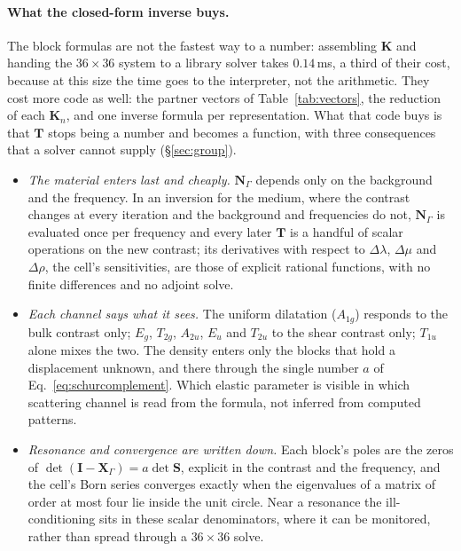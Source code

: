 \documentclass[11pt,a4paper]{article}
\newcommand{\bK}{\mathbf{K}}
\newcommand{\bN}{\mathbf{N}}
\newcommand{\bT}{\mathbf{T}}
\newcommand{\bI}{\mathbf{I}}
\begin{document}
\paragraph{What the closed-form inverse buys.} The block formulas are not the fastest way to a number:
assembling $\bK$ and handing the $36\times36$ system to a library solver takes $0.14$\,ms, a third of their
cost, because at this size the time goes to the interpreter, not the arithmetic. They cost more code as
well: the partner vectors of Table~\ref{tab:vectors}, the reduction of each $\bK_n$, and one inverse
formula per representation. What that code buys is that $\bT$ stops being a number and becomes a function,
with three consequences that a solver cannot supply (\S\ref{sec:group}).
\begin{itemize}
\item \emph{The material enters last and cheaply.} $\bN_\Gamma$ depends only on the background and the
frequency. In an inversion for the medium, where the contrast changes at every iteration and the background
and frequencies do not, $\bN_\Gamma$ is evaluated once per frequency and every later $\bT$ is a handful of
scalar operations on the new contrast; its derivatives with respect to $\Delta\lambda$, $\Delta\mu$ and
$\Delta\rho$, the cell's sensitivities, are those of explicit rational functions, with no finite differences
and no adjoint solve.
\item \emph{Each channel says what it sees.} The uniform dilatation ($A_{1g}$) responds to the bulk
contrast only; $E_g$, $T_{2g}$, $A_{2u}$, $E_u$ and $T_{2u}$ to the shear contrast only; $T_{1u}$ alone
mixes the two. The density enters only the blocks that hold a displacement unknown, and there through the
single number $a$ of Eq.~\eqref{eq:schurcomplement}. Which elastic parameter is visible in which scattering channel is read from
the formula, not inferred from computed patterns.
\item \emph{Resonance and convergence are written down.} Each block's poles are the zeros of
$\det(\bI-\mathbf X_\Gamma)=a\det\mathbf S$, explicit in the contrast and the frequency, and the cell's Born series converges exactly
when the eigenvalues of a matrix of order at most four lie inside the unit circle. Near a resonance the
ill-conditioning sits in these scalar denominators, where it can be monitored, rather than spread through a
$36\times36$ solve.
\end{itemize}
\end{document}
